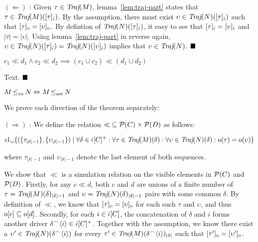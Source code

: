 $(\Leftarrow)$ : Given $\tau \in \operatorname{\textit{Traj}}(M)$, lemma~\ref{lem:traj-part} states that $\tau \in \operatorname{\textit{Traj}}(M)([\tau]_{\dot{\iota}})$. By the assumption, there must exist $\upsilon \in \operatorname{\textit{Traj}}(N)([\tau]_{\dot{\iota}})$ such that $[\tau]_{\mathrm{o}} = [\upsilon]_{\mathrm{o}}$. By defintion of $\operatorname{\textit{Traj}}(N)([\tau]_{\dot{\iota}})$, it easy to see that $[\tau]_{\dot{\iota}} = [\upsilon]_{\dot{\iota}}$ and $| \tau | = | \upsilon |$. Using lemma~\ref{lem:traj-part} in reverse again, $\upsilon \in \operatorname{\textit{Traj}}(N)([\tau]_{\dot{\iota}}) = \operatorname{\textit{Traj}}(N)([\upsilon]_{\dot{\iota}})$ implies that $\upsilon \in \operatorname{\textit{Traj}}(N)$. $\Qed$

\begin{lemma} \label{lem:cl-union}
$c_{1} \ll d_{1} \wedge c_{2} \ll d_{2} \implies (c_{1} \cup c_{2}) \ll (d_{1} \cup d_{2})$
\end{lemma}

Text. $\Qed$

\begin{lemma} \label{lem:in-iff-sim}
$M \operatorname{\leq}_{in} N \Leftrightarrow M \operatorname{\operatorname{\leq}_{\textrm{set}}} N$
\end{lemma}

We prove each direction of the theorem separately:

$(\Rightarrow)$ : We define the relation $\ll \, \subseteq \mathcal{P}(C) \times \mathcal{P}(D)$ as follows:

\begin{equation*}
\textrm{cl}_{\, \cup} \{ ( \{ \tau_{| \delta | - 1} \} , \{ \upsilon_{| \delta | - 1} \} ) \mid \forall \delta \in \dot{\iota}[C]^{+} : \forall \tau \in \operatorname{\textit{Traj}}(M)(\delta) : \forall \upsilon \in \operatorname{\textit{Traj}}(N)(\delta) : \mathrm{o}(\tau) = \mathrm{o}(\upsilon) \}
\end{equation*}

\noindent where $\tau_{| \delta | - 1}$ and $\upsilon_{| \delta | - 1}$ denote the last element of both sequences.

We show that $\ll$ is a simulation relation on the visible elements in $\mathcal{P}(C)$ and $\mathcal{P}(D)$. Firstly, for any $c \ll d$, both $c$ and $d$ are unions of a finite number of $\tau = \operatorname{\textit{Traj}}(M)(\delta)_{| \delta | - 1}$ and $\upsilon = \operatorname{\textit{Traj}}(N)(\delta)_{| \delta | - 1}$ pairs with some common $\delta$. By definition of $\ll$, we know that $[\tau]_{\mathrm{o}} = [\upsilon]_{\mathrm{o}}$ for each such $\tau$ and $\upsilon$, and thus $\mathrm{o}[c] \subseteq \mathrm{o}[d]$. Secondly, for each $i \in \dot{\iota}[C]$, the concatenation of $\delta$ and $i$ forms another driver $\delta^{\frown} \langle i \rangle \in \dot{\iota}[C]^{+}$. Together with the assumption, we know there exist a $\upsilon' \in \operatorname{\textit{Traj}}(N)(\delta^{\frown} \langle i \rangle)$ for every $\tau' \in \operatorname{\textit{Traj}}(M)(\delta^{\frown} \langle i \rangle)_{| \delta |}$ such that $[\tau']_{\mathrm{o}} = [\upsilon']_{\mathrm{o}}$.

